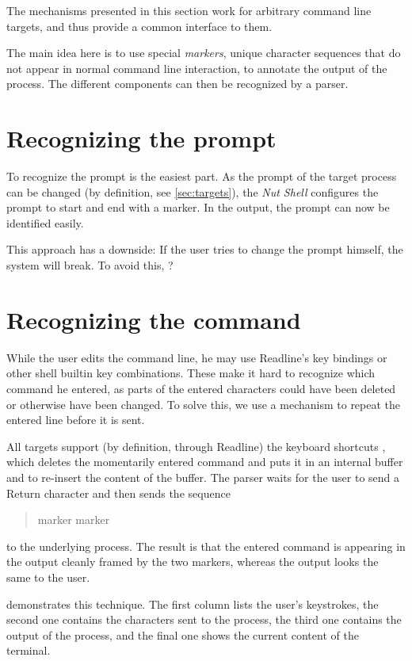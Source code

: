 \documentclass[paper=a4,twoside,abstract=on,cleardoublepage=empty,numbers=noenddot,toc=bib,12pt]{scrreprt}
\begin{document}
The mechanisms presented in this section work for arbitrary command line targets, and thus provide a common interface to them.

The main idea here is to use special \emph{markers}, unique character sequences that do not appear in normal command line interaction, to annotate the output of the process. The different components can then be recognized by a parser.

\section{Recognizing the prompt}

To recognize the prompt is the easiest part. As the prompt of the target process can be changed (by definition, see \cref{sec:targets}), the \emph{Nut Shell} configures the prompt to start and end with a marker. In the output, the prompt can now be identified easily.

This approach has a downside: If the user tries to change the prompt himself, the system will break. To avoid this, ?

\section{Recognizing the command}

While the user edits the command line, he may use Readline's key bindings or other shell builtin key combinations. These make it hard to recognize which command he entered, as parts of the entered characters could have been deleted or otherwise have been changed. To solve this, we use a mechanism to repeat the entered line before it is sent.

All targets support (by definition, through Readline) the keyboard shortcuts , which deletes the momentarily entered command and puts it in an internal buffer and  to re-insert the content of the buffer. The parser waits for the user to send a Return character and then sends the sequence

\begin{quote}
     marker   marker  \keys{\return}
\end{quote}

to the underlying process. The result is that the entered command is appearing in the output cleanly framed by the two markers, whereas the output looks the same to the user.

 demonstrates this technique. The first column lists the user's keystrokes, the second one contains the characters sent to the process, the third one contains the output of the process, and the final one shows the current content of the terminal.
\end{document}
